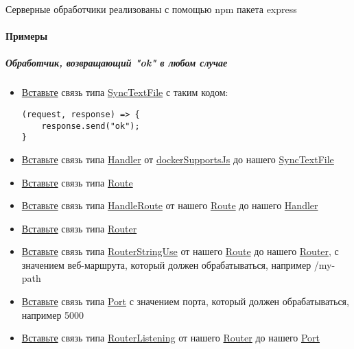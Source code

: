 Серверные обработчики реализованы с помощью npm пакета express
\paragraph{Примеры}
\subparagraph{Обработчик, возвращающий "ok" в любом случае}
\begin{itemize}
      \item \hyperlink{DeepCase.InsertLink.Description}{Вставьте} связь типа
            \hyperlink{Core.SyncTextFile.Description}{SyncTextFile} с таким
            кодом:
            \begin{lstlisting}
(request, response) => {
    response.send("ok");
}
\end{lstlisting}
      \item \hyperlink{DeepCase.InsertLink.Description}{Вставьте} связь типа
            \hyperlink{Core.Handler.Description}{Handler} от
            \hyperlink{Core.dockerSupportsJs.Description}{dockerSupportsJs}
            до нашего \hyperlink{Core.SyncTextFile.Description}{SyncTextFile}
      \item \hyperlink{DeepCase.InsertLink.Description}{Вставьте} связь типа
            \hyperlink{Core.Route.Description}{Route}
      \item \hyperlink{DeepCase.InsertLink.Description}{Вставьте} связь типа
            \hyperlink{Core.HandleRoute.Description}{HandleRoute} от нашего
            \hyperlink{Core.Route.Description}{Route} до нашего
            \hyperlink{Core.Handler.Description}{Handler}
      \item \hyperlink{DeepCase.InsertLink.Description}{Вставьте} связь типа
            \hyperlink{Core.Router.Description}{Router}
      \item \hyperlink{DeepCase.InsertLink.Description}{Вставьте} связь типа
            \hyperlink{Core.RouterStringUse.Description}{RouterStringUse} от
            нашего
            \hyperlink{Core.Route.Description}{Route} до нашего
            \hyperlink{Core.Router.Description}{Router},
            с
            значением
            веб-маршрута, который должен обрабатываться, например /my-path
      \item \hyperlink{DeepCase.InsertLink.Description}{Вставьте} связь типа
            \hyperlink{Core.Port.Description}{Port} с значением порта, который
            должен
            обрабатываться, например
            5000
      \item \hyperlink{DeepCase.InsertLink.Description}{Вставьте} связь типа
            \hyperlink{Core.RouterListening.Description}{RouterListening} от
            нашего
            \hyperlink{Core.Router.Description}{Router} до нашего
            \hyperlink{Core.Port.Description}{Port}
\end{itemize}

